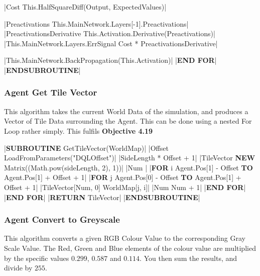 \begin{flushleft}
\begin{pseudocode}
        |Cost \leftarrow This.HalfSquareDiff(Output, ExpectedValues)|

        |Preactivations \leftarrow This.MainNetwork.Layers[-1].Preactivations|
        |PreactivationsDerivative \leftarrow This.Activation.Derivative(Preactivations)|
        |This.MainNetwork.Layers.ErrSignal \leftarrow Cost * PreactivationsDerivative|

        |This.MainNetwork.BackPropagation(This.Activation)|
    |\textbf{END FOR}|
|\textbf{ENDSUBROUTINE}|
                \end{pseudocode}

                \vspace{0.5cm}
            \subsubsection{Agent Get Tile Vector}
                This algorithm takes the current World Data of the simulation, and produces a Vector of Tile Data surrounding the Agent. This can
                be done using a nested For Loop rather simply. This fulfils \textbf{Objective 4.19}

                \vspace{0.2cm}
                \begin{pseudocode}
|\textbf{SUBROUTINE} GetTileVector(WorldMap)|
    |Offset \leftarrow LoadFromParameters("DQLOffset")|
    |SideLength  * Offset + 1|
    |TileVector \leftarrow \textbf{NEW} Matrix((Math.pow(sideLength, 2), 1))|
    |Num |
    |\textbf{FOR} i \leftarrow Agent.Pos[1] - Offset \textbf{TO} Agent.Pos[1] + Offset + 1|
        |\textbf{FOR} j \leftarrow Agent.Pos[0] - Offset \textbf{TO} Agent.Pos[1] + Offset + 1|
            |TileVector[Num, 0] \leftarrow WorldMap[j, i]|
            |Num \leftarrow Num + 1|
        |\textbf{END FOR}|
    |\textbf{END FOR}|
    |\textbf{RETURN} TileVector|
|\textbf{ENDSUBROUTINE}|
                \end{pseudocode}
                
                \vspace{0.5cm}
            \subsubsection{Agent Convert to Greyscale}
                This algorithm converts a given RGB Colour Value to the corresponding Gray Scale Value. The Red, Green and Blue elements of
                the colour value are multiplied by the specific values $0.299$, $0.587$ and $0.114$. You then sum the results, and divide by 
                $255$. 


\end{flushleft}
